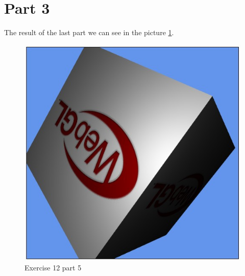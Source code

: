 \section{Part 3}
The result of the last part we can see in the picture \ref{fig:exercise_12_part_5}.
\begin{figure}[ht!]
	\begin{center}
		\includegraphics[width=.6\textwidth]{figures/exercise_12_part_5}
	\end{center}
	\vspace{-4.5ex}\caption{Exercise 12 part 5}
	\label{fig:exercise_12_part_5} 
\end{figure}